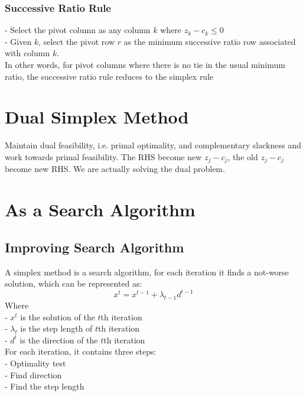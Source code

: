 				\subsubsection{Successive Ratio Rule}
					- Select the pivot column as any column $k$ where $z_k - c_k \le 0$\\
					- Given $k$, select the pivot row $r$ as the minimum successive ratio row associated with column $k$.\\
					In other words, for pivot columns where there is no tie in the usual minimum ratio, the successive ratio rule reduces to the simplex rule

		\section{Dual Simplex Method}
			Maintain dual feasibility, i.e. primal optimality, and complementary slackness and work towards primal feasibility.
			The RHS become new $z_j - c_j$, the old $z_j - c_j$ become new RHS. We are actually solving the dual problem.

		\section{As a Search Algorithm}
			\subsection{Improving Search Algorithm}
				A simplex method is a search algorithm, for each iteration it finds a not-worse solution, which can be represented as:\\
				\begin{equation}x^t = x^{t-1}+\lambda_{t-1}d^{t-1}  \end{equation}
				Where\\
				- $x^t$ is the solution of the $t$th iteration\\
				- $\lambda_t$ is the step length of $t$th iteration\\
				- $d^t$ is the direction of the $t$th iteration\\
				For each iteration, it contains three steps:\\
				- Optimality test\\
				- Find direction\\
				- Find the step length
				
